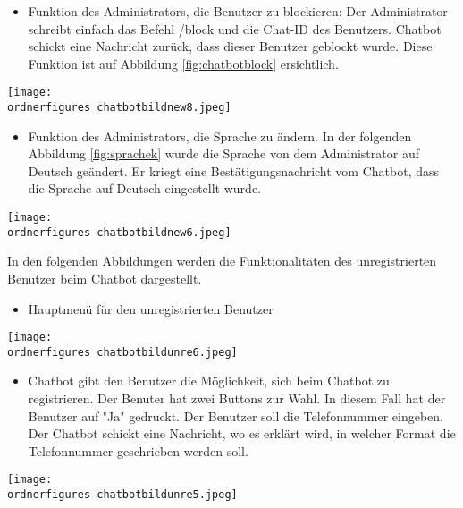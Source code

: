 \begin{itemize}
	\item Funktion des Administrators, die Benutzer zu blockieren: Der Administrator schreibt einfach das Befehl /block und die Chat-ID des Benutzers. Chatbot schickt eine Nachricht zurück, dass dieser Benutzer geblockt wurde. Diese Funktion ist auf Abbildung \ref{fig:chatbotblock} ersichtlich.
\end{itemize}
\begin{center}
	\captionsetup{type=figure}
	\texttt{[image: \\ordnerfigures chatbotbildnew8.jpeg]}
	\caption{Benutzer Blockierung}
	\label{fig:chatbotblock} 
	\captionsetup{type=figure} 
\end{center}
\begin{itemize}
	\item Funktion des Administrators, die Sprache zu \"andern. In der folgenden Abbildung \ref{fig:sprachek} wurde die Sprache von dem Administrator auf Deutsch ge\"andert. Er kriegt eine Best\"atigungsnachricht vom Chatbot, dass die Sprache auf Deutsch eingestellt wurde. 
\end{itemize}
\begin{center}
	\captionsetup{type=figure}
	\texttt{[image: \\ordnerfigures chatbotbildnew6.jpeg]}
	\caption{Spracheinstellungen}
	\label{fig:sprachek} 
	\captionsetup{type=figure} 
\end{center}
In den folgenden Abbildungen werden die Funktionalitäten des unregistrierten Benutzer beim Chatbot dargestellt.
\begin{itemize}
	\item Hauptmen\"u f\"ur den unregistrierten Benutzer
\end{itemize}
\begin{center}
	\captionsetup{type=figure}
	\texttt{[image: \\ordnerfigures chatbotbildunre6.jpeg]}
	\caption{Hauptmen\"u f\"ur den unregistrierten Benutzer}
	\label{fig:chaftboregistr}
\end{center}
\begin{itemize}
	\item Chatbot gibt den Benutzer die Möglichkeit, sich beim Chatbot zu registrieren. Der Benuter hat zwei Buttons zur Wahl. In diesem Fall hat der Benutzer auf "Ja" gedruckt. Der Benutzer soll die Telefonnummer eingeben. Der Chatbot schickt eine Nachricht, wo es erkl\"art wird, in welcher Format die Telefonnummer geschrieben werden soll.
\end{itemize}
\begin{center}
	\captionsetup{type=figure}
	\texttt{[image: \\ordnerfigures chatbotbildunre5.jpeg]}
	\caption{Registrierung beim Chatbot}
	\label{fig:chfdsatboregistr}
\end{center}
